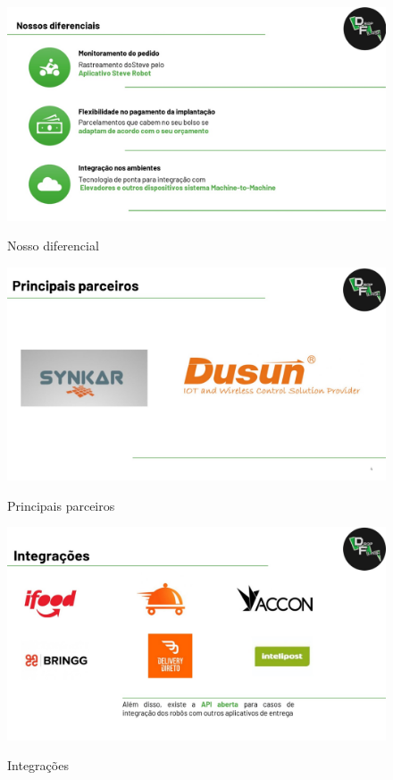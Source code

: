 \begin{figure} [!ht]
    \centering
    \caption{Nosso diferencial}
    \includegraphics[width=1.0\linewidth]{figuras/mark3.jpeg}
    \label{fig:enter-label}
\end{figure}

\begin{figure} [!ht]
    \centering
    \caption{Principais parceiros}
    \includegraphics[width=1.0\linewidth]{figuras/mark4.jpeg}
    \label{fig:enter-label}
\end{figure}

\begin{figure} [!ht]
    \centering
    \caption{Integrações}
    \includegraphics[width=1.0\linewidth]{figuras/mark5.jpeg}
    \label{fig:enter-label}
\end{figure}

